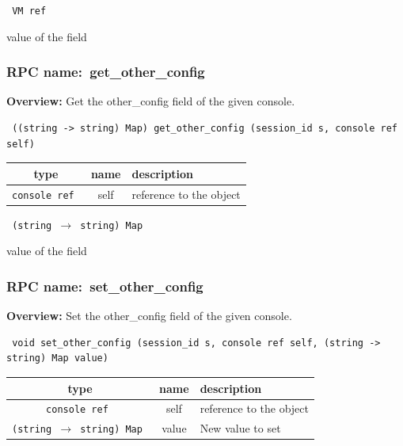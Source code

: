 {\tt 
VM ref
}


value of the field
\vspace{0.3cm}
\vspace{0.3cm}
\vspace{0.3cm}
\subsubsection{RPC name:~get\_other\_config}

{\bf Overview:} 
Get the other\_config field of the given console.

\begin{verbatim} ((string -> string) Map) get_other_config (session_id s, console ref self)\end{verbatim}



 
\vspace{0.3cm}
\begin{tabular}{|c|c|p{7cm}|}
 \hline
{\bf type} & {\bf name} & {\bf description} \\ \hline
{\tt console ref } & self & reference to the object \\ \hline 

\end{tabular}

\vspace{0.3cm}

{\tt 
(string $\rightarrow$ string) Map
}


value of the field
\vspace{0.3cm}
\vspace{0.3cm}
\vspace{0.3cm}
\subsubsection{RPC name:~set\_other\_config}

{\bf Overview:} 
Set the other\_config field of the given console.

\begin{verbatim} void set_other_config (session_id s, console ref self, (string -> string) Map value)\end{verbatim}



 
\vspace{0.3cm}
\begin{tabular}{|c|c|p{7cm}|}
 \hline
{\bf type} & {\bf name} & {\bf description} \\ \hline
{\tt console ref } & self & reference to the object \\ \hline 

{\tt (string $\rightarrow$ string) Map } & value & New value to set \\ \hline 

\end{tabular}

